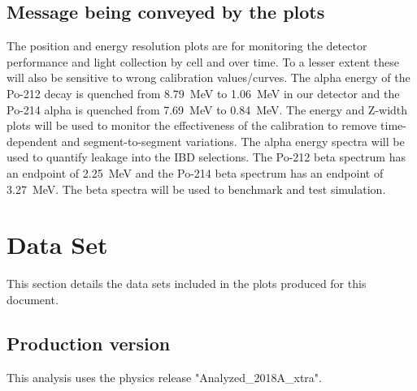 \subsection{Message being conveyed by the plots}
The position and energy resolution plots are for monitoring the detector performance and light collection by cell and over time. To a lesser extent these will also be sensitive to wrong calibration values/curves. The alpha energy of the Po-212 decay is quenched from 8.79~MeV to 1.06~MeV in our detector and the Po-214 alpha is quenched from 7.69~MeV to 0.84~MeV. The energy and Z-width plots will be used to monitor the effectiveness of the calibration to remove time-dependent and segment-to-segment variations. The alpha energy spectra will be used to quantify leakage into the IBD selections. The Po-212 beta spectrum has an endpoint of 2.25~MeV and the Po-214 beta spectrum has an endpoint of 3.27~MeV. The beta spectra will be used to benchmark and test simulation.

\section{Data Set}
This section details the data sets included in the plots produced for this document.
\subsection{Production version}
This analysis uses the physics release "Analyzed\_2018A\_xtra".
